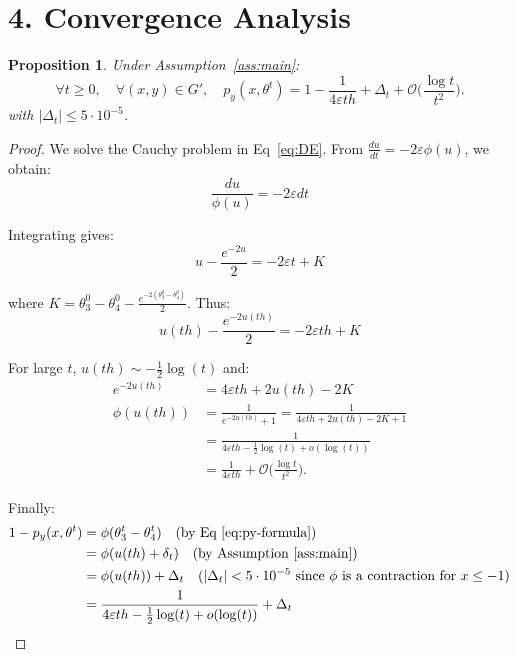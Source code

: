 \documentclass[11pt]{article}
\newtheorem{proposition}{Proposition}
\begin{document}
\section*{4. Convergence Analysis}

\begin{proposition}
\label{prop:convergence}
Under Assumption~\ref{ass:main}:
\begin{equation}
\label{eq:py-t}
\forall t \geq 0, \quad \forall (x, y) \in G', \quad p_y(x, \theta^t) = 1 - \frac{1}{4\varepsilon th} + \Delta_t + \mathcal{O}\Big(\frac{\log t}{t^2}\Big).
\end{equation}
with $|\Delta_t| \leq 5\cdot 10^{-5}$.
\end{proposition}

\begin{proof}
We solve the Cauchy problem in Eq~\eqref{eq:DE}. From $\frac{du}{dt} = -2\varepsilon\phi(u)$, we obtain:
$$\frac{du}{\phi(u)} = -2\varepsilon dt$$

Integrating gives:
$$u - \frac{e^{-2u}}{2} = -2\varepsilon t + K$$

where $K = \theta_3^0 - \theta_4^0 - \frac{e^{-2(\theta_3^0 - \theta_4^0)}}{2}$. Thus:
\begin{equation}
\label{eq:sol-DE}
u(th) - \frac{e^{-2u(th)}}{2} = -2\varepsilon th + K
\end{equation}

For large $t$, $u(th) \sim -\frac{1}{2}\log(t)$ and:
\begin{align*}
e^{-2u(th)} &= 4\varepsilon th + 2u(th) - 2K \\
\phi(u(th)) &= \frac{1}{e^{-2u(th)} + 1} = \frac{1}{4\varepsilon th + 2u(th) - 2K + 1} \\
&= \frac{1}{4\varepsilon th - \frac{1}{2}\log(t) + o(\log(t))}\\
&= \frac{1}{4\varepsilon th} + \mathcal{O}\Big(\frac{\log t}{t^2}\Big).
\end{align*}

Finally:
\begin{align*}
1 - p_y(x, \theta^t) 
&= \phi(\theta_3^t - \theta_4^t) \quad \text{(by Eq~\eqref{eq:py-formula})} \\
&= \phi(u(th) + \delta_t) \quad \text{(by Assumption~\ref{ass:main})} \\
&= \phi(u(th)) + \Delta_t \quad \text{($|\Delta_t| < 5\cdot 10^{-5}$ since $\phi$ is a contraction for $x \leq -1$)} \\
&= \frac{1}{4\varepsilon th - \frac{1}{2}\log(t) + o(\log(t))} + \Delta_t
\end{align*}
\end{proof}
\end{document}
